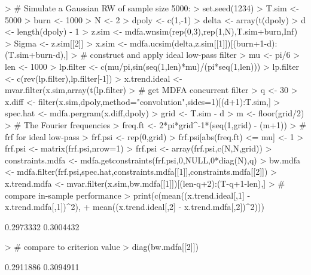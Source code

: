 \documentclass[a4paper]{book}
\begin{document}
\begin{Schunk}
\begin{Sinput}
> # Simulate a Gaussian RW of sample size 5000:
> set.seed(1234)
> T.sim <- 5000
> burn <- 1000
> N <- 2
> dpoly <- c(1,-1)
> delta <- array(t(dpoly) %
> d <- length(dpoly) - 1
> z.sim <- mdfa.wnsim(rep(0,3),rep(1,N),T.sim+burn,Inf)
> Sigma <- z.sim[[2]]
> x.sim <- mdfa.ucsim(delta,z.sim[[1]])[(burn+1-d):(T.sim+burn-d),]
> # construct and apply ideal low-pass filter
> mu <- pi/6
> len <- 1000
> lp.filter <- c(mu/pi,sin(seq(1,len)*mu)/(pi*seq(1,len)))
> lp.filter <- c(rev(lp.filter),lp.filter[-1])
> x.trend.ideal <- mvar.filter(x.sim,array(t(lp.filter) %
> # get MDFA concurrent filter
> q <- 30
> x.diff <- filter(x.sim,dpoly,method="convolution",sides=1)[(d+1):T.sim,]
> spec.hat <- mdfa.pergram(x.diff,dpoly)
> grid <- T.sim - d
> m <- floor(grid/2)
> # The Fourier frequencies
> freq.ft <- 2*pi*grid^{-1}*(seq(1,grid) - (m+1))
> # frf for ideal low-pass
> frf.psi <- rep(0,grid)
> frf.psi[abs(freq.ft) <= mu] <- 1
> frf.psi <- matrix(frf.psi,nrow=1) %
> frf.psi <- array(frf.psi,c(N,N,grid))
> constraints.mdfa <- mdfa.getconstraints(frf.psi,0,NULL,0*diag(N),q)
> bw.mdfa <- mdfa.filter(frf.psi,spec.hat,constraints.mdfa[[1]],constraints.mdfa[[2]])
> x.trend.mdfa <- mvar.filter(x.sim,bw.mdfa[[1]])[(len-q+2):(T-q+1-len),]
> # compare in-sample performance
> print(c(mean((x.trend.ideal[,1] - x.trend.mdfa[,1])^2),
+ 	mean((x.trend.ideal[,2] - x.trend.mdfa[,2])^2)))
\end{Sinput}
\begin{Soutput}
[1] 0.2973332 0.3004432
\end{Soutput}
\begin{Sinput}
> # compare to criterion value
> diag(bw.mdfa[[2]])
\end{Sinput}
\begin{Soutput}
[1] 0.2911886 0.3094911
\end{Soutput}
\end{Schunk}
 
\end{document}
